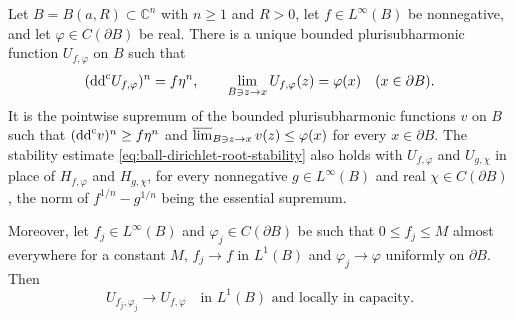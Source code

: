\begin{theorem}\label{thm:bounded-density-ball-dirichlet}
Let $B=B(a,R)\subset\mathbb C^n$ with $n\ge1$ and $R>0$, let $f\in L^\infty(B)$ be nonnegative, and let $\varphi\in C(\partial B)$ be real. There is a unique bounded plurisubharmonic function $U_{f,\varphi}$ on $B$ such that
\[
 (\mathrm{dd}^{\mathrm{c}} U_{f,\varphi})^n=f\eta^n,
 \qquad\lim_{B\ni z\to x}U_{f,\varphi}(z)=\varphi(x)
       \quad(x\in\partial B).
\]
It is the pointwise supremum of the bounded plurisubharmonic functions $v$ on $B$ such that $(\mathrm{dd}^{\mathrm{c}} v)^n\ge f\eta^n$ and $\varlimsup_{B\ni z\to x}v(z)\le\varphi(x)$ for every $x\in\partial B$. The stability estimate \eqref{eq:ball-dirichlet-root-stability} also holds with $U_{f,\varphi}$ and $U_{g,\chi}$ in place of $H_{f,\varphi}$ and $H_{g,\chi}$, for every nonnegative $g\in L^\infty(B)$ and real $\chi\in C(\partial B)$, the norm of $f^{1/n}-g^{1/n}$ being the essential supremum.

Moreover, let $f_j\in L^\infty(B)$ and $\varphi_j\in C(\partial B)$ be such that $0\le f_j\le M$ almost everywhere for a constant $M$, $f_j\to f$ in $L^1(B)$ and $\varphi_j\to\varphi$ uniformly on $\partial B$. Then
\[
 U_{f_j,\varphi_j}\longrightarrow U_{f,\varphi}
 \quad\text{in }L^1(B)\text{ and locally in capacity}.
\]
\end{theorem}
